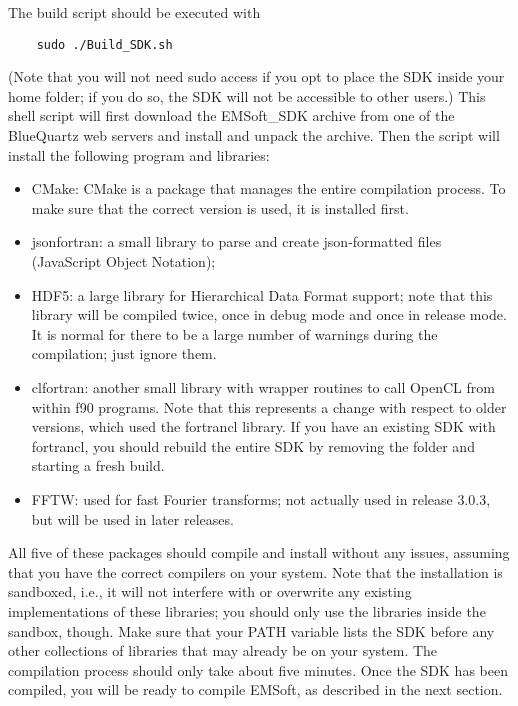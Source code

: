 \documentclass[DIV=calc, paper=letter, fontsize=11pt]{scrartcl}	 %
\newcommand{\ctp}{\textsf{EMSoft}}
\begin{document}
The build script should be executed with
\begin{verbatim}
	sudo ./Build_SDK.sh
\end{verbatim}
(Note that you will not need sudo access if you opt to place the SDK inside your home folder; if you do so, the SDK will not be accessible
to other users.) This shell script will first download the \textsf{EMSoft\_SDK} archive from one of the BlueQuartz web servers and install
and unpack the archive. Then the script will install the following program and libraries:
\begin{itemize}
\item \textsf{CMake}: CMake is a package that manages the entire compilation process.  To make sure that the correct version is used, it is installed first.
\item \textsf{jsonfortran}: a small library to parse and create json-formatted files (JavaScript Object Notation);
\item \textsf{HDF5}: a large library for Hierarchical Data Format support; note that this library will be compiled twice, once in debug mode and once in release mode.
It is normal for there to be a large number of warnings during the compilation; just ignore them.
\item \textsf{clfortran}: another small library with wrapper routines to call OpenCL from within f90 programs. {\color{red}Note that this represents a 
change with respect to older versions, which used the \textsf{fortrancl} library.  If you have an existing SDK with \textsf{fortrancl}, you should rebuild
the entire SDK by removing the folder and starting a fresh build.}
\item \textsf{FFTW}: used for fast Fourier transforms; not actually used in release 3.0.3, but will be used in later releases.
\end{itemize}
All five of these packages should compile and install without any issues, assuming that you have the correct compilers on your system.  Note that the 
installation is sandboxed, i.e., it will not interfere with or overwrite any existing implementations of these libraries;  you should only use the libraries
inside the sandbox, though.  Make sure that your PATH variable lists the SDK before any other collections of libraries that may already be on your system.  The compilation process should only take about five minutes.  Once the SDK has been compiled, you will be ready to compile \ctp, 
as described in the next section.
\end{document}
